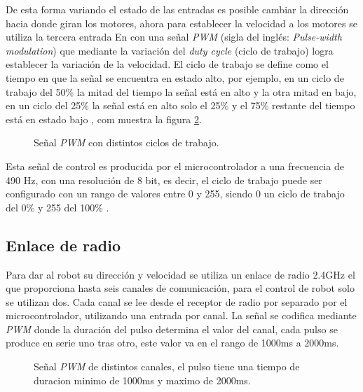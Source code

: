 \documentclass{iccmemoria}
\begin{document}
De esta forma variando el estado de las entradas es posible cambiar la dirección hacia donde giran los motores, ahora para establecer la velocidad a los motores se utiliza la tercera entrada En con una señal \emph{PWM} (sigla del inglés: \emph{Pulse-width modulation}) que mediante la variación del \emph{duty cycle} (ciclo de trabajo) logra establecer la variación de la velocidad. El ciclo de trabajo se define como el tiempo en que la señal se encuentra en estado alto, por ejemplo, en un ciclo de trabajo del 50\% la mitad del tiempo la señal está en alto y la otra mitad en bajo, en un ciclo del 25\% la señal está en alto solo el 25\% y el 75\% restante del tiempo está en estado bajo \cite{barrett2006microcontrollers}, com muestra la figura \ref{fig:pwm}.\\

\begin{figure}[H]
  \centering
  \selectfont{
  
  }
  \caption{Señal \emph{PWM} con distintos ciclos de trabajo.}
  \label{fig:pwm}
\end{figure}
 
Esta señal de control es producida por el microcontrolador a una frecuencia de 490 Hz, con una resolución de 8 bit, es decir, el ciclo de trabajo puede ser configurado con un rango de valores entre 0 y 255, siendo 0 un ciclo de trabajo del 0\% y 255 del 100\% \cite{referenceAnalogWrite}.\\

\subsection{Enlace de radio}

Para dar al robot su dirección y velocidad se utiliza un enlace de radio 2.4GHz el que proporciona hasta seis canales de comunicación, para el control de robot solo se utilizan dos. Cada canal se lee desde el receptor de radio por separado por el microcontrolador, utilizando una entrada por canal. La señal se codifica mediante \emph{PWM} donde la duración del pulso determina el valor del canal, cada pulso se produce en serie uno tras otro, este valor va en el rango de 1000ms a 2000ms.\\

\begin{figure}[H]
  \centering
  \selectfont{
  
  }
  \caption{Señal \emph{PWM} de distintos canales, el pulso tiene una tiempo de duracion minimo de 1000ms y maximo de 2000ms.}
  \label{fig:pwm}
\end{figure}
\end{document}
